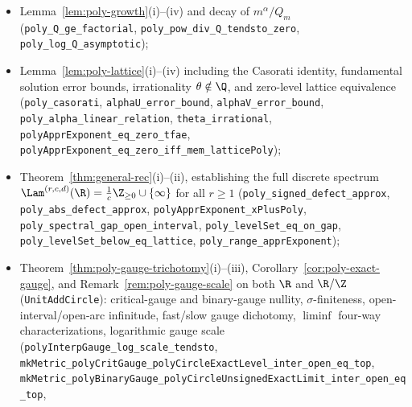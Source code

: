 \begin{itemize}[leftmargin=1.8em]
\item Lemma~\ref{lem:poly-growth}(i)--(iv) and decay of $m^\alpha/Q_m$
(\texttt{poly\_\allowbreak Q\_\allowbreak ge\_\allowbreak factorial},
\texttt{poly\_\allowbreak pow\_\allowbreak div\_\allowbreak Q\_\allowbreak tendsto\_\allowbreak zero},
\texttt{poly\_\allowbreak log\_\allowbreak Q\_\allowbreak asymptotic});
\item Lemma~\ref{lem:poly-lattice}(i)--(iv) including the Casorati identity,
fundamental solution error bounds, irrationality $\theta\notin\Q$, and
zero-level lattice equivalence
(\texttt{poly\_\allowbreak casorati},
\texttt{alphaU\_\allowbreak error\_\allowbreak bound},
\texttt{alphaV\_\allowbreak error\_\allowbreak bound},
\texttt{poly\_\allowbreak alpha\_\allowbreak linear\_\allowbreak relation},
\texttt{theta\_\allowbreak irrational},
\texttt{polyApprExponent\_\allowbreak eq\_\allowbreak zero\_\allowbreak tfae},
\texttt{polyApprExponent\_\allowbreak eq\_\allowbreak zero\_\allowbreak iff\_\allowbreak mem\_\allowbreak latticePoly});
\item Theorem~\ref{thm:general-rec}(i)--(ii), establishing the full discrete
spectrum $\Lam^{(r,c,d)}(\R)=\frac{1}{c}\Z_{\ge0}\cup\{\infty\}$ for all
$r\ge1$
(\texttt{poly\_\allowbreak signed\_\allowbreak defect\_\allowbreak approx},
\texttt{poly\_\allowbreak abs\_\allowbreak defect\_\allowbreak approx},
\texttt{polyApprExponent\_\allowbreak xPlusPoly},
\texttt{poly\_\allowbreak spectral\_\allowbreak gap\_\allowbreak open\_\allowbreak interval},
\texttt{poly\_\allowbreak levelSet\_\allowbreak eq\_\allowbreak on\_\allowbreak gap},
\texttt{poly\_\allowbreak levelSet\_\allowbreak below\_\allowbreak eq\_\allowbreak lattice},
\texttt{poly\_\allowbreak range\_\allowbreak apprExponent});
\item Theorem~\ref{thm:poly-gauge-trichotomy}(i)--(iii),
Corollary~\ref{cor:poly-exact-gauge}, and Remark~\ref{rem:poly-gauge-scale} on
both $\R$ and $\R/\Z$ (\texttt{UnitAddCircle}): critical-gauge and
binary-gauge nullity, $\sigma$-finiteness, open-interval/open-arc infinitude,
fast/slow gauge dichotomy, $\liminf$ four-way characterizations, logarithmic
gauge scale (\texttt{polyInterpGauge\_\allowbreak log\_\allowbreak scale\_\allowbreak tendsto},
\texttt{mkMetric\_\allowbreak polyCritGauge\_\allowbreak polyCircleExactLevel\_\allowbreak inter\_\allowbreak open\_\allowbreak eq\_\allowbreak top},
\texttt{mkMetric\_\allowbreak polyBinaryGauge\_\allowbreak polyCircleUnsignedExactLimit\_\allowbreak inter\_\allowbreak open\_\allowbreak eq\_\allowbreak top},

\end{itemize}
